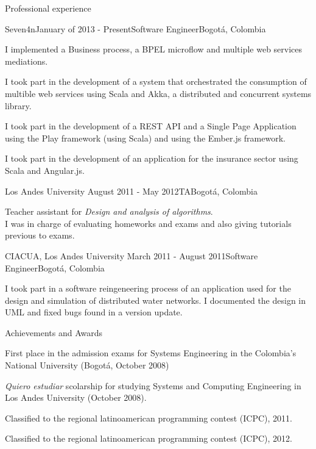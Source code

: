 \documentclass{resume} %
\def\uniandes{Los Andes University }
\begin{document}
\begin{rSection}{Professional experience}

\begin{rSubsection}{Seven4n}{January of 2013 - Present}{Software Engineer}{Bogot\'a, Colombia}
\item I implemented a Business process, a BPEL microflow and multiple web services mediations.
\item I took part in the development of a system that orchestrated the consumption of multible web services using Scala and Akka, a distributed and concurrent systems library.
\item I took part in the development of a REST API and a Single Page Application using the Play framework (using Scala) and using the Ember.js framework.
\item I took part in the development of an application for the insurance sector using Scala and Angular.js.
\end{rSubsection}


\begin{rSubsection}{\uniandes}{August 2011 - May 2012}{TA}{Bogot\'a, Colombia}
\item Teacher assistant for \textit{Design and analysis of algorithms}.\\
I was in charge of evaluating homeworks and exams and also giving tutorials previous to exams.
\end{rSubsection}


\begin{rSubsection}{CIACUA, \uniandes}{March 2011 - August 2011}{Software Engineer}{Bogot\'a, Colombia}
\item I took part in a software reingeneering process of an application used for the design and simulation of distributed water networks. I documented the design in UML and fixed bugs found in a version update.
\end{rSubsection}

\end{rSection}

\begin{rSection}{Achievements and Awards}
\begin{rSubsection}{}{}{}{}
\item First place in the admission exams for Systems Engineering in the Colombia's National University (Bogot\'a, October 2008)
\item \textsl{Quiero estudiar} scolarship for studying Systems and Computing Engineering in Los Andes University (October 2008).
\item Classified to the regional latinoamerican programming contest (ICPC), 2011.
\item Classified to the regional latinoamerican programming contest (ICPC), 2012.
\end{rSubsection}
\end{rSection}
\end{document}
